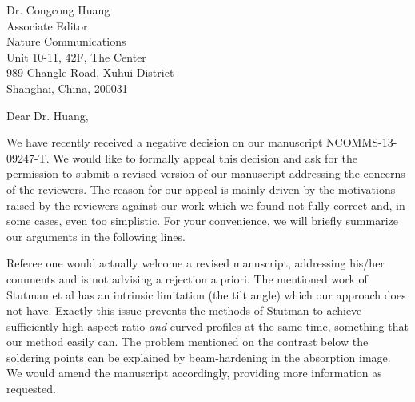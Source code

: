 \documentclass[a4paper,english]{scrlttr2}
\begin{document}
\begin{letter}{Dr. Congcong Huang\\

Associate Editor\\
Nature Communications \\

Unit 10-11, 42F, The Center\\
989 Changle Road, Xuhui District\\
Shanghai, China, 200031}
    \opening{Dear Dr. Huang,}

We have recently received a negative decision on our
manuscript \textsc{NCOMMS-13-09247-T}. We would like to formally appeal this
decision and ask for the permission to submit a revised version of our
manuscript addressing the concerns of the reviewers. The reason for our
appeal is mainly driven by the motivations raised by the reviewers against
our work which we found not fully correct and, in some cases, even too
simplistic. For your convenience, we will briefly summarize our arguments in
the following lines.

Referee one would actually welcome a revised manuscript, addressing his/her
comments and is not advising a rejection a priori. The mentioned work of
Stutman et al has an intrinsic limitation (the tilt angle) which our
approach does not have. Exactly this issue prevents the methods of Stutman
to achieve sufficiently high-aspect ratio \emph{and} curved profiles at the same
time, something that our method easily can. The problem mentioned on the
contrast below the soldering points can be explained by beam-hardening in
the absorption image. We would amend the manuscript accordingly, providing
more information as requested.


\end{letter}
\end{document}
